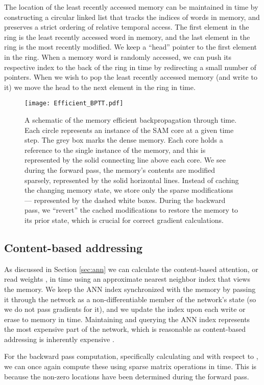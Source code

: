 \documentclass{article}
\begin{document}
The location of the least recently accessed memory can be maintained in  time by constructing a circular linked list that tracks the indices of words in memory, and preserves a strict ordering of relative temporal access. The first element in the ring is the least recently accessed word in memory, and the last element in the ring is the most recently modified. We keep a ``head'' pointer to the first element in the ring. When a memory word is randomly accessed, we can push its respective index to the back of the ring in  time by redirecting a small number of pointers. When we wish to pop the least recently accessed memory (and write to it) we move the head to the next element in the ring in  time.


\begin{figure}[H]
    \centering
    \texttt{[image: Efficient\_BPTT.pdf]}
    \caption{A schematic of the memory efficient backpropagation through time. Each circle represents an instance of the SAM core at a given time step. The grey box marks the dense memory. Each core holds a reference to the single instance of the memory, and this is represented by the solid connecting line above each core. We see during the forward pass, the memory's contents are modified sparsely, represented by the solid horizontal lines. Instead of caching the changing memory state, we store only the sparse modifications --- represented by the dashed white boxes. During the backward pass, we ``revert'' the cached modifications to restore the memory to its prior state, which is crucial for correct gradient calculations.}
    \label{fig:bptt}
\end{figure}

\subsection{Content-based addressing}
As discussed in Section \ref{sec:ann} we can calculate the content-based attention, or read weights , in  time using an approximate nearest neighbor index that views the memory. We keep the ANN index synchronized with the memory by passing it through the network as a non-differentiable member of the network's state (so we do not pass gradients for it), and we update the index upon each write or erase to memory in  time. Maintaining and querying the ANN index represents the most expensive part of the network, which is reasonable as content-based addressing is inherently expensive \cite{motwani2007lower,arya1998optimal}.

For the backward pass computation, specifically calculating  and  with respect to , we can once again compute these using sparse matrix operations in  time. This is because the  non-zero locations have been determined during the forward pass.
\end{document}

